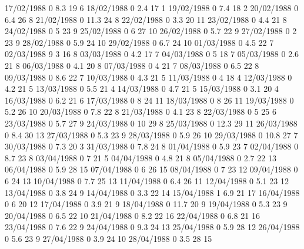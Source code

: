 17/02/1988  0      8.3    19     6 
18/02/1988  0      2.4    17     1 
19/02/1988  0      7.4    18     2 
20/02/1988  0      6.4    26     8 
21/02/1988  0      11.3   24     8 
22/02/1988  0      3.3    20     11 
23/02/1988  0      4.4    21     8 
24/02/1988  0      5      23     9 
25/02/1988  0      6      27     10 
26/02/1988  0      5.7    22     9 
27/02/1988  0      2      23     9 
28/02/1988  0      5.9    24     10 
29/02/1988  0      6.7    24     10 
01/03/1988  0      4.5    22     7 
02/03/1988  9      3      16     8 
03/03/1988  0      4.2    17     7 
04/03/1988  0      5      18     7 
05/03/1988  0      2.6    21     8 
06/03/1988  0      4.1    20     8 
07/03/1988  0      4      21     7 
08/03/1988  0      6.5    22     8 
09/03/1988  0      8.6    22     7 
10/03/1988  0      4.3    21     5 
11/03/1988  0      4      18     4 
12/03/1988  0      4.2    21     5 
13/03/1988  0      5.5    21     4 
14/03/1988  0      4.7    21     5 
15/03/1988  0      3.1    20     4 
16/03/1988  0      6.2    21     6 
17/03/1988  0      8      24     11 
18/03/1988  0      8      26     11 
19/03/1988  0      5.2    26     10 
20/03/1988  0      7.8    22     8 
21/03/1988  0      4.1    23     8 
22/03/1988  0      5      25     6 
23/03/1988  0      5.7    27     9 
24/03/1988  0      10     29     8 
25/03/1988  0      12.3   29     11 
26/03/1988  0      8.4    30     13 
27/03/1988  0      5.3    23     9 
28/03/1988  0      5.9    26     10 
29/03/1988  0      10.8   27     7 
30/03/1988  0      7.3    20     3 
31/03/1988  0      7.8    24     8 
01/04/1988  0      5.9    23     7 
02/04/1988  0      8.7    23     8 
03/04/1988  0      7      21     5 
04/04/1988  0      4.8    21     8 
05/04/1988  0      2.7    22     13 
06/04/1988  0      5.9    28     15 
07/04/1988  0      6      26     15 
08/04/1988  0      7      23     12 
09/04/1988  0      6      24     13 
10/04/1988  0      7.7    25     13 
11/04/1988  0      6.4    26     11 
12/04/1988  0      5.1    23     12 
13/04/1988  0      3.8    24     9 
14/04/1988  0      3.3    22     14 
15/04/1988  1      6.9    21     17 
16/04/1988  0      6      20     12 
17/04/1988  0      3.9    21     9 
18/04/1988  0      11.7   20     9 
19/04/1988  0      5.3    23     9 
20/04/1988  0      6.5    22     10 
21/04/1988  0      8.2    22     16 
22/04/1988  0      6.8    21     16 
23/04/1988  0      7.6    22     9 
24/04/1988  0      9.3    24     13 
25/04/1988  0      5.9    28     12 
26/04/1988  0      5.6    23     9 
27/04/1988  0      3.9    24     10 
28/04/1988  0      3.5    28     15 
